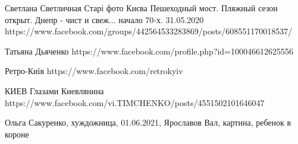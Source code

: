  
 
 
 
 


Светлана Светличная
Старі фото Києва
Пешеходный мост. Пляжный сезон открыт. Днепр - чист и свеж... начало 70-х.
31.05.2020
https://www.facebook.com/groups/442564533283869/posts/608551170018537/

Татьяна Дьяченко
https://www.facebook.com/profile.php?id=100046612625556

Ретро-Київ
https://www.facebook.com/retrokyiv

КИЕВ Глазами Киевлянина
https://www.facebook.com/vi.TIMCHENKO/posts/4551502101646047

Ольга Сакуренко, хуждожница, 01.06.2021, Ярославов Вал, картина, ребенок в короне
